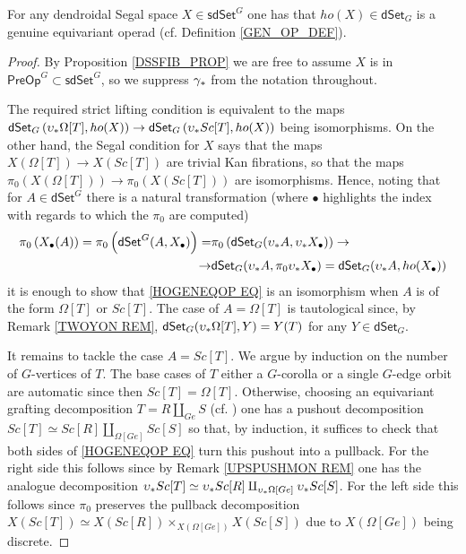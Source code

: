 \documentclass[a4paper,10pt
 ,draft
]{article}%
\begin{document}
\begin{proposition}
For any dendroidal Segal space $X \in \mathsf{sdSet}^G$ one has that 
$ho(X) \in \mathsf{dSet}_G$ is a genuine equivariant operad (cf. Definition \ref{GEN_OP_DEF}).
\end{proposition}

\begin{proof}
By Proposition \ref{DSSFIB_PROP} we are free to assume 
$X$ is in $\mathsf{PreOp}^G \subset \mathsf{sdSet}^G$, so we suppress $\gamma_{\**}$ from the notation throughout.

The required strict lifting condition is equivalent to the 
 maps
$\mathsf{dSet}_G\left(\upsilon_{\**}\Omega[T], ho(X)\right)
\to
\mathsf{dSet}_G\left(\upsilon_{\**}Sc[T], ho(X)\right)$
being isomorphisms.
On the other hand, the Segal condition for $X$ says that the maps 
$X(\Omega[T]) \to X(Sc[T])$
are trivial Kan fibrations, so that the maps 
$\pi_0\left(X(\Omega[T])\right) \to \pi_0\left(X(Sc[T])\right)$
are isomorphisms. 
Hence, noting that
for $A \in \mathsf{dSet}^G$
there is a natural transformation
(where $\bullet$ highlights the index with regards to which the $\pi_0$ are computed)
\begin{equation}\label{HOGENEQOP EQ}
\begin{split}
	\pi_0\left( X_{\bullet}(A) \right)=
	\pi_0 \left(
	\mathsf{dSet}^G(A,X_{\bullet})
	\right)
= &
	\pi_0 \left(
	\mathsf{dSet}_G(\upsilon_{\**} A,\upsilon_{\**} X_{\bullet})
	\right)
\to 
\\
\to &
	\mathsf{dSet}_G(\upsilon_{\**} A,\pi_0 \upsilon_{\**} X_{\bullet})
=
	\mathsf{dSet}_G(\upsilon_{\**} A,ho(X_{\bullet}))
\end{split}
\end{equation}
it is enough to show that \eqref{HOGENEQOP EQ}
is an isomorphism when $A$ is of the form $\Omega[T]$ or $Sc[T]$.
The case of $A=\Omega[T]$
is tautological since, by Remark \ref{TWOYON REM},
$\mathsf{dSet}_G(\upsilon_{\**}\Omega[T],Y) = Y(T)$
for any $Y \in \mathsf{dSet}_G$. 

It remains to tackle the case $A=Sc[T]$.
We argue by induction on the number of $G$-vertices of $T$.
The base cases of $T$ either a $G$-corolla or a single $G$-edge orbit are automatic since then $Sc[T] = \Omega[T]$.
Otherwise, choosing an equivariant grafting decomposition
$T = R \amalg_{Ge} S$ (cf. \cite[(5.18) and Prop. 6.19]{Per18})
one has a pushout decomposition
$Sc[T] \simeq Sc[R] \amalg_{\Omega[Ge]} Sc[S]$
so that, by induction, it suffices to check that both sides of 
\eqref{HOGENEQOP EQ} turn this pushout into a pullback.
For the right side this follows since by 
Remark \ref{UPSPUSHMON REM}
one has the analogue decomposition
$\upsilon_{\**} Sc[T] \simeq \upsilon_{\**} Sc[R] \amalg_{\upsilon_{\**}\Omega[Ge]} \upsilon_{\**} Sc[S]$.
For the left side this follows since $\pi_0$
preserves the pullback decomposition
$X(Sc[T]) \simeq X(Sc[R]) \times_{X(\Omega[Ge])} X(Sc[S])$ due to
$X(\Omega[Ge])$ being discrete.
\end{proof}
\end{document}
